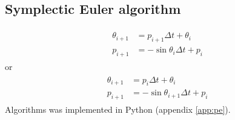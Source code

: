 \subsection{Symplectic Euler algorithm}
\begin{align}
\begin{split}
\label{al:pe-euler_s1}
\theta_{i+1} &= p_{i+1} \Delta t + \theta_i \\
p_{i+1} &= - \sin{\theta_i} \Delta t + p_i
\end{split}
\end{align}
or
\begin{align}
\begin{split}
\label{al:pe-euler_s2}
\theta_{i+1} &= p_{i} \Delta t + \theta_i \\
p_{i+1} &= - \sin{\theta_{i+1}} \Delta t + p_i
\end{split}
\end{align}
Algorithms  was implemented in Python (appendix \ref{app:pe}).

